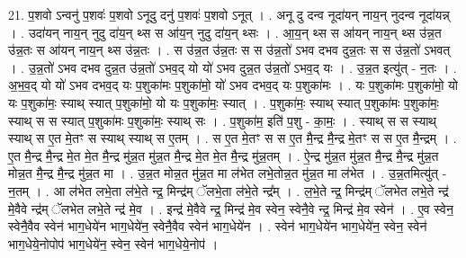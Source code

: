 \documentclass[17pt]{extarticle}
\begin{document}
21. प॒शवो ऽन्वनु॑ प॒शवः॑ प॒शवो ऽनूदु दनु॑ प॒शवः॑ प॒शवो ऽनूत् । . अनू दु दन्व नूदा॑यन् नाय॒न् नुदन्व नूदा॑यन्न् । . उदा॑यन् नाय॒न् नुदु दा॑य॒न् थ्स स आ॑य॒न् नुदु दा॑य॒न् थ्सः । . आ॒य॒न् थ्स स आ॑यन् नाय॒न् थ्स उ॑न्न॒त उ॑न्न॒तः स आ॑यन् नाय॒न् थ्स उ॑न्न॒तः । . स उ॑न्न॒त उ॑न्न॒तः स स उ॑न्न॒तो॑ ऽभव दभव दुन्न॒तः स स उ॑न्न॒तो॑ ऽभवत् । . उ॒न्न॒तो॑ ऽभव दभव दुन्न॒त उ॑न्न॒तो॑ ऽभव॒द् यो यो॑ ऽभव दुन्न॒त उ॑न्न॒तो॑ ऽभव॒द् यः । . उ॒न्न॒त इत्यु॑त् - न॒तः । . अ॒भ॒व॒द् यो यो॑ ऽभव दभव॒द् यः प॒शुका॑मः प॒शुका॑मो॒ यो॑ ऽभव दभव॒द् यः प॒शुका॑मः । . यः प॒शुका॑मः प॒शुका॑मो॒ यो यः प॒शुका॑मः॒ स्याथ् स्यात् प॒शुका॑मो॒ यो यः प॒शुका॑मः॒ स्यात् । . प॒शुका॑मः॒ स्याथ् स्यात् प॒शुका॑मः प॒शुका॑मः॒ स्याथ् स स स्यात् प॒शुका॑मः प॒शुका॑मः॒ स्याथ् सः । . प॒शुका॑म॒ इति॑ प॒शु - का॒मः॒ । . स्याथ् स स स्याथ् स्याथ् स ए॒त मे॒तꣳ स स्याथ् स्याथ् स ए॒तम् । . स ए॒त मे॒तꣳ स स ए॒त मै॒न्द्र मै॒न्द्र मे॒तꣳ स स ए॒त मै॒न्द्रम् । . ए॒त मै॒न्द्र मै॒न्द्र मे॒त मे॒त मै॒न्द्र मु॑न्न॒त मु॑न्न॒त मै॒न्द्र मे॒त मे॒त मै॒न्द्र मु॑न्न॒तम् । . ऐ॒न्द्र मु॑न्न॒त मु॑न्न॒त मै॒न्द्र मै॒न्द्र मु॑न्न॒त मोन्न॒त मै॒न्द्र मै॒न्द्र मु॑न्न॒त मा । . उ॒न्न॒त मोन्न॒त मु॑न्न॒त मा ल॑भेत लभे॒तोन्न॒त मु॑न्न॒त मा ल॑भेत । . उ॒न्न॒तमित्यु॑त् - न॒तम् । . आ ल॑भेत लभे॒ता ल॑भे॒ते न्द्र॒ मिन्द्र॑म् ॅलभे॒ता ल॑भे॒ते न्द्र᳚म् । . ल॒भे॒ते न्द्र॒ मिन्द्र॑म् ॅलभेत लभे॒ते न्द्र॑ मे॒वैवे न्द्र॑म् ॅलभेत लभे॒ते न्द्र॑ मे॒व । . इन्द्र॑ मे॒वैवे न्द्र॒ मिन्द्र॑ मे॒व स्वेन॒ स्वेनै॒वे न्द्र॒ मिन्द्र॑ मे॒व स्वेन॑ । . ए॒व स्वेन॒ स्वेनै॒वैव स्वेन॑ भाग॒धेये॑न भाग॒धेये॑न॒ स्वेनै॒वैव स्वेन॑ भाग॒धेये॑न । . स्वेन॑ भाग॒धेये॑न भाग॒धेये॑न॒ स्वेन॒ स्वेन॑ भाग॒धेये॒नोपोप॑ भाग॒धेये॑न॒ स्वेन॒ स्वेन॑ भाग॒धेये॒नोप॑ । \newline
\end{document}
